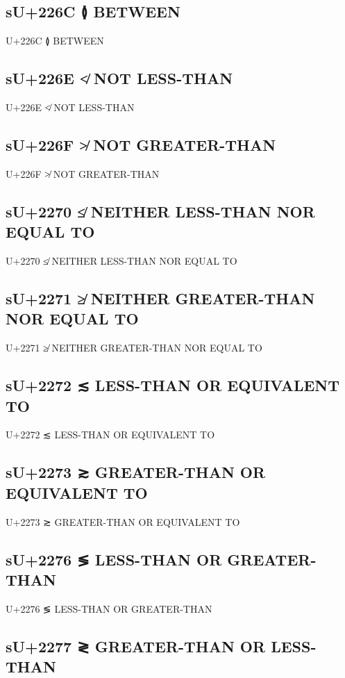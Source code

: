 \subsection{sU+226C ≬ BETWEEN}

U+226C ≬ BETWEEN

\subsection{sU+226E ≮ NOT LESS-THAN}

U+226E ≮ NOT LESS-THAN

\subsection{sU+226F ≯ NOT GREATER-THAN}

U+226F ≯ NOT GREATER-THAN

\subsection{sU+2270 ≰ NEITHER LESS-THAN NOR EQUAL TO}

U+2270 ≰ NEITHER LESS-THAN NOR EQUAL TO

\subsection{sU+2271 ≱ NEITHER GREATER-THAN NOR EQUAL TO}

U+2271 ≱ NEITHER GREATER-THAN NOR EQUAL TO

\subsection{sU+2272 ≲ LESS-THAN OR EQUIVALENT TO}

U+2272 ≲ LESS-THAN OR EQUIVALENT TO

\subsection{sU+2273 ≳ GREATER-THAN OR EQUIVALENT TO}

U+2273 ≳ GREATER-THAN OR EQUIVALENT TO

\subsection{sU+2276 ≶ LESS-THAN OR GREATER-THAN}

U+2276 ≶ LESS-THAN OR GREATER-THAN

\subsection{sU+2277 ≷ GREATER-THAN OR LESS-THAN}

